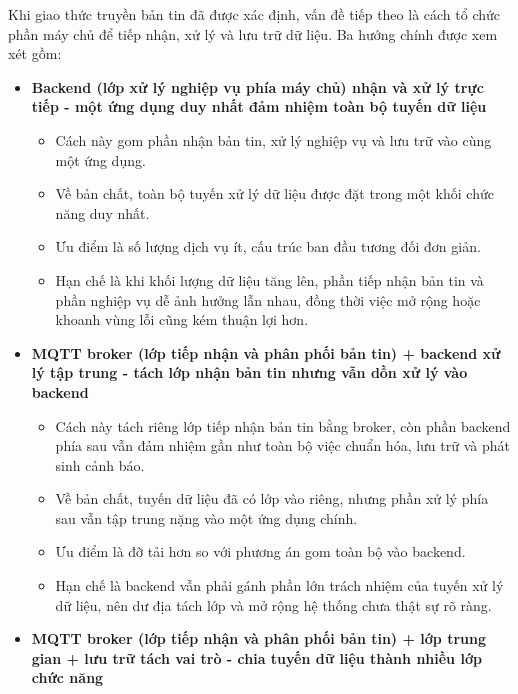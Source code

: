 \documentclass[a4paper]{extarticle}
\providecommand{\tightlist}{%
  \setlength{\itemsep}{0pt}\setlength{\parskip}{0pt}}
\begin{document}
Khi giao thức truyền bản tin đã được xác định, vấn đề tiếp theo là cách tổ chức phần máy chủ để tiếp nhận, xử lý và lưu trữ dữ liệu. Ba hướng chính được xem xét gồm:

\begin{itemize}
\tightlist
\item
  \textbf{Backend (lớp xử lý nghiệp vụ phía máy chủ) nhận và xử lý trực tiếp - một ứng dụng duy nhất đảm nhiệm toàn bộ tuyến dữ liệu}

  \begin{itemize}
  \tightlist
  \item
    Cách này gom phần nhận bản tin, xử lý nghiệp vụ và lưu trữ vào cùng một ứng dụng.
  \item
    Về bản chất, toàn bộ tuyến xử lý dữ liệu được đặt trong một khối chức năng duy nhất.
  \item
    Ưu điểm là số lượng dịch vụ ít, cấu trúc ban đầu tương đối đơn giản.
  \item
    Hạn chế là khi khối lượng dữ liệu tăng lên, phần tiếp nhận bản tin và phần nghiệp vụ dễ ảnh hưởng lẫn nhau, đồng thời việc mở rộng hoặc khoanh vùng lỗi cũng kém thuận lợi hơn.
  \end{itemize}
\item
  \textbf{MQTT broker (lớp tiếp nhận và phân phối bản tin) + backend xử lý tập trung - tách lớp nhận bản tin nhưng vẫn dồn xử lý vào backend}

  \begin{itemize}
  \tightlist
  \item
    Cách này tách riêng lớp tiếp nhận bản tin bằng broker, còn phần backend phía sau vẫn đảm nhiệm gần như toàn bộ việc chuẩn hóa, lưu trữ và phát sinh cảnh báo.
  \item
    Về bản chất, tuyến dữ liệu đã có lớp vào riêng, nhưng phần xử lý phía sau vẫn tập trung nặng vào một ứng dụng chính.
  \item
    Ưu điểm là đỡ tải hơn so với phương án gom toàn bộ vào backend.
  \item
    Hạn chế là backend vẫn phải gánh phần lớn trách nhiệm của tuyến xử lý dữ liệu, nên dư địa tách lớp và mở rộng hệ thống chưa thật sự rõ ràng.
  \end{itemize}
\item
  \textbf{MQTT broker (lớp tiếp nhận và phân phối bản tin) + lớp trung gian + lưu trữ tách vai trò - chia tuyến dữ liệu thành nhiều lớp chức năng}


\end{itemize}
\end{document}
